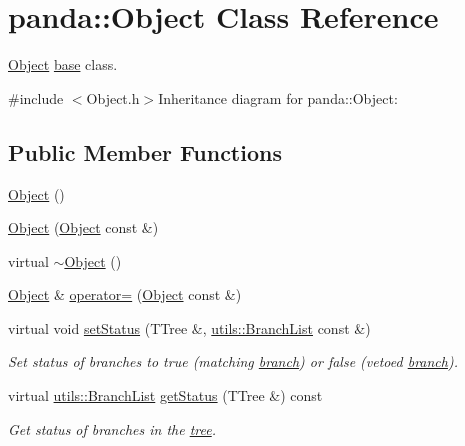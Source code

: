 \hypertarget{classpanda_1_1Object}{
\section{panda::Object Class Reference}
\label{classpanda_1_1Object}
}


\hyperlink{classpanda_1_1Object}{Object} \hyperlink{namespacepanda_1_1base}{base} class.  


{\ttfamily \#include $<$Object.h$>$}Inheritance diagram for panda::Object:\subsection*{Public Member Functions}
\begin{DoxyCompactItemize}
\item 
\hyperlink{classpanda_1_1Object_aaa29338b8f6013a1b2cc9899c10bf5d1}{Object} ()
\item 
\hyperlink{classpanda_1_1Object_a2cb7b48f10893ce4b2122bfcc77b4858}{Object} (\hyperlink{classpanda_1_1Object}{Object} const \&)
\item 
virtual \hyperlink{classpanda_1_1Object_a447fe991d26f3b37f271c2ed7860b564}{$\sim$Object} ()
\item 
\hyperlink{classpanda_1_1Object}{Object} \& \hyperlink{classpanda_1_1Object_a083629646c455db50ea99b994aac3b7b}{operator=} (\hyperlink{classpanda_1_1Object}{Object} const \&)
\item 
virtual void \hyperlink{classpanda_1_1Object_a282e820b1ad431db22ca4d4dd20b55e0}{setStatus} (TTree \&, \hyperlink{classpanda_1_1utils_1_1BranchList}{utils::BranchList} const \&)
\begin{DoxyCompactList}\small\item\em Set status of branches to true (matching \hyperlink{namespacepanda_1_1branch}{branch}) or false (vetoed \hyperlink{namespacepanda_1_1branch}{branch}). \item\end{DoxyCompactList}\item 
virtual \hyperlink{classpanda_1_1utils_1_1BranchList}{utils::BranchList} \hyperlink{classpanda_1_1Object_ad575503e839f7aa6cc47434b3a24cb80}{getStatus} (TTree \&) const 
\begin{DoxyCompactList}\small\item\em Get status of branches in the \hyperlink{namespacepanda_1_1tree}{tree}. \item\end{DoxyCompactList}\item 

\end{DoxyCompactItemize}
